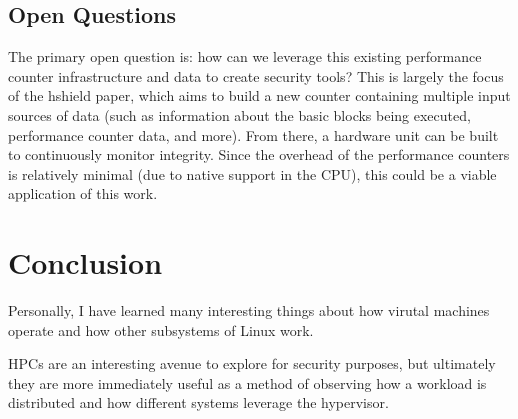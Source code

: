 \documentclass[notitlepage]{article}
\begin{document}
\subsection{Open Questions}
The primary open question is: how can we leverage this existing performance
counter infrastructure and data to create security tools? This is largely the
focus of the hshield %
paper, which aims to build a new counter containing multiple input sources of
data (such as information about the basic blocks being executed, performance
counter data, and more). From there, a hardware unit can be built to
continuously monitor integrity. Since the overhead of the performance counters
is relatively minimal (due to native support in the CPU), this could be a viable
application of this work.


\section{Conclusion}
\label{sec:conclusion}
Personally, I have learned many interesting things about how virutal machines
operate and how other subsystems of Linux work.

HPCs are an interesting avenue to explore for security purposes, but ultimately
they are more immediately useful as a method of observing how a workload is
distributed and how different systems leverage the hypervisor.


\newpage

\nocite{*}

{}

\end{document}

